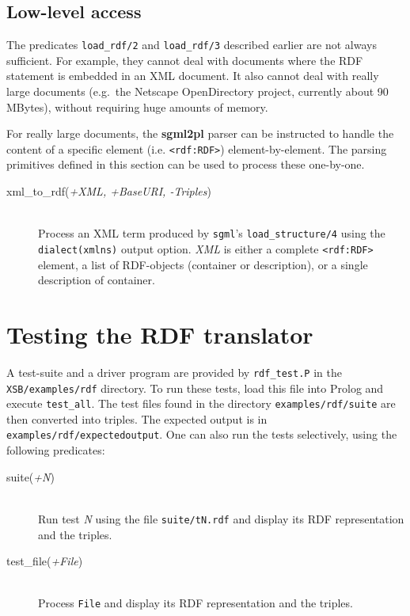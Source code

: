 \subsection{Low-level access}

The predicates {\tt load\_rdf/2} and \texttt{load\_rdf/3} described earlier are
not always sufficient. For example, they
cannot deal with documents where the RDF statement is embedded in an XML
document. It also cannot deal with really large documents (e.g.\ the
Netscape OpenDirectory project, currently about 90 MBytes), without requiring
huge amounts of memory.

For really large documents, the {\bf sgml2pl} parser can be instructed
to handle the content of a specific element (i.e. \verb$<rdf:RDF>$)
element-by-element.  The parsing primitives defined in this section
can be used to process these one-by-one.

\begin{description}
    \item[xml\_to\_rdf({\it +XML, +BaseURI, -Triples})]\mbox{}\\
Process an XML term produced by \texttt{sgml}'s \texttt{load\_structure/4}  using the
\texttt{dialect(xmlns)}  output option.  {\it XML} is either
a complete \verb$<rdf:RDF>$ element, a list of RDF-objects
(container or description), or a single description of container.
\end{description}

\section{Testing the RDF translator}

A test-suite and a driver program are provided by {\tt rdf\_test.P} in
the {\tt XSB/examples/rdf} directory. To run these tests, load this file
into Prolog and execute \texttt{test\_all}. 
The test files found in the directory
{\tt examples/rdf/suite} are then converted into triples.
The expected output is in {\tt examples/rdf/expectedoutput}. One can
also run the tests selectively, using the following predicates:
\begin{description}
    \item[suite({\it +N})]\mbox{}\\
Run test {\it N} using the file {\tt suite/tN.rdf} and display its
RDF representation and the triples.
    \item[test\_file({\it +File})]\mbox{}\\
Process {\tt File} and display its RDF representation and the triples.
\end{description}



